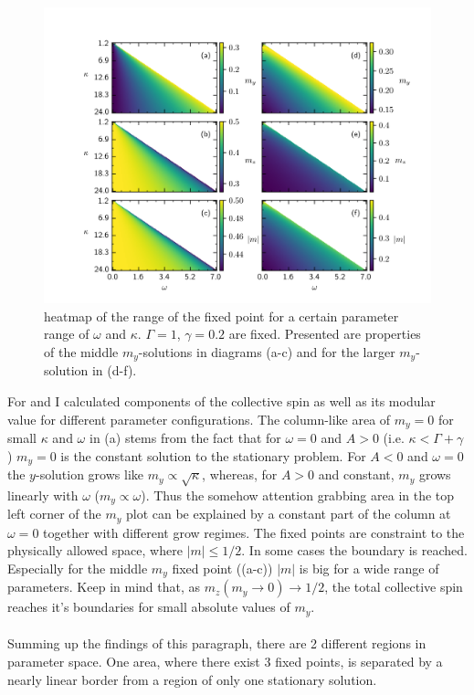 \begin{figure}[H]
    \vspace*{-0.8cm}
    \hspace*{-1cm}
    \includegraphics{pictures/fixp_bound_heatmap_ml2.png}
    \caption{heatmap of the range of the fixed point for a certain parameter range of $\omega$ and $\kappa$. $\Gamma=1$, $\gamma=0.2$ are fixed. Presented are properties of the middle $m_y$-solutions in diagrams (a-c) and for the larger $m_y$-solution in (d-f).}
    \label{fig:fixp_midlarge_bound_hm}
\end{figure}
For  and  I calculated components of the collective spin as well as its modular value for different parameter configurations.
The column-like area of $m_y=0$ for small $\kappa$ and $\omega$ in (a) stems from the fact that for $\omega=0$ and $A>0$ (i.e. $\kappa<\Gamma+\gamma$) $m_y=0$ is the constant solution to the stationary problem. For $A<0$ and $\omega=0$ the $y$-solution grows like $m_y\propto\sqrt{\kappa}$, whereas, for $A>0$ and constant, $m_y$ grows linearly with $\omega$ ($m_y\propto\omega$). Thus the somehow attention grabbing area in the top left corner of the $m_y$ plot can be explained by a constant part of the column at $\omega=0$ together with different grow regimes.
The fixed points are constraint to the physically allowed space, where $|m|\leq1/2$. In some cases the boundary is reached. Especially for the middle $m_y$ fixed point ((a-c)) $|m|$ is big for a wide range of parameters. Keep in mind that, as $m_z(m_y\rightarrow0)\rightarrow1/2$, the total collective spin reaches it's boundaries for small absolute values of $m_y$.\\\\
Summing up the findings of this paragraph, there are 2 different regions in parameter space. One area, where there exist 3 fixed points, is separated by a nearly linear border from a region of only one stationary solution.


